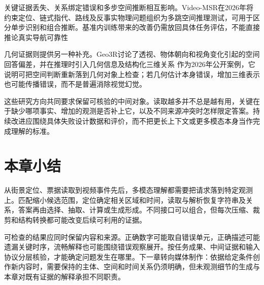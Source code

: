 关键证据丢失、关系绑定错误和多步空间推断相互影响。Video-MSR在2026年将约束定位、链式指代、路线及反事实物理问题组织为多跳空间推理测试，可用于区分单步识别和组合推断。基准内训练带来的改善仍需放回具体任务评估，不能直接推论真实导航可靠性

几何证据则提供另一种补充。Geo3R讨论了透视、物体朝向和视角变化引起的空间回答偏差，并在推理时引入几何信息及结构化三维关系
作为2026年公开案例，它说明可把空间判断重新落到几何对象上检查；若几何估计本身错误，增加三维表示也可能传播错误，而不是普遍消除视觉幻觉。

这些研究方向共同要求保留可核验的中间对象。读取越多并不总是越有用，关键在于缺少哪项事实、增加的观测是否补上它，以及不同来源冲突时怎样限定答案。持续改进应围绕具体失败设计数据和评价，而不把更长上下文或更多模态本身当作完成理解的标准。

\section{本章小结}
\label{sec:vision-understanding-summary}

从街景定位、票据读取到视频事件先后，多模态理解都需要把请求落到特定观测上。匹配缩小候选范围，定位确定相关区域和时间，读取与解析恢复字符串及关系，答案再由选择、抽取、计算或生成形成。不同接口可以组合，但每次压缩、裁剪和结构转换都可能改变后续可利用的证据。

可检查的结果应同时保留内容和来源。正确数字可能取自错误单元，正确描述可能遗漏关键时序，流畅解释也可能围绕错误观察展开。按任务成果、中间证据和输入协议分层核验，才能确定问题发生在哪里。下一章转向媒体制作：依据给定条件创作新内容时，需要保持的主体、空间和时间关系仍须明确，但未观测细节的生成与本章对既有证据的解释承担不同职责。
